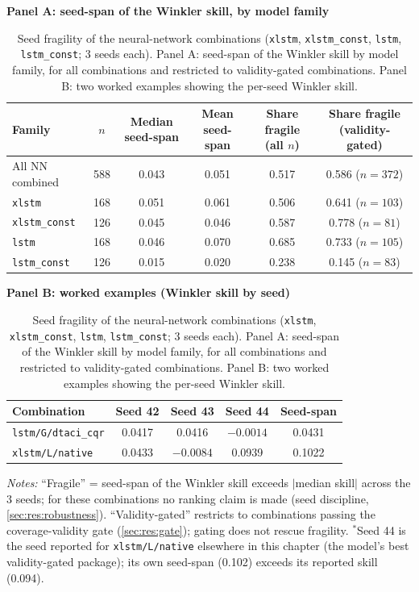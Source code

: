 \begin{table}[t]
\centering
\caption{Seed fragility of the neural-network combinations (\texttt{xlstm}, \texttt{xlstm\_const}, \texttt{lstm}, \texttt{lstm\_const}; 3 seeds each). Panel A: seed-span of the Winkler skill by model family, for all combinations and restricted to validity-gated combinations. Panel B: two worked examples showing the per-seed Winkler skill.}
\label{tab:res_robustness_seeds}

\textbf{Panel A: seed-span of the Winkler skill, by model family}\\[1mm]
\begin{tabular}{lccccc}
\toprule
Family & $n$ & Median seed-span & Mean seed-span & Share fragile (all $n$) & Share fragile (validity-gated) \\
\midrule
All NN combined      & 588 & 0.043 & 0.051 & 0.517 & 0.586 ($n=372$) \\
\texttt{xlstm}        & 168 & 0.051 & 0.061 & 0.506 & 0.641 ($n=103$) \\
\texttt{xlstm\_const}  & 126 & 0.045 & 0.046 & 0.587 & 0.778 ($n=81$)  \\
\texttt{lstm}          & 168 & 0.046 & 0.070 & 0.685 & 0.733 ($n=105$) \\
\texttt{lstm\_const}   & 126 & 0.015 & 0.020 & 0.238 & 0.145 ($n=83$)  \\
\bottomrule
\end{tabular}

\vspace{3mm}
\textbf{Panel B: worked examples (Winkler skill by seed)}\\[1mm]
\begin{tabular}{lcccc}
\toprule
Combination & Seed 42 & Seed 43 & Seed 44 & Seed-span \\
\midrule
\texttt{lstm/G/dtaci\_cqr}  & 0.0417 & 0.0416 & $-0.0014$ & 0.0431 \\
\texttt{xlstm/L/native}     & 0.0433 & $-0.0084$ & 0.0939\rlap{$^\ast$} & 0.1022 \\
\bottomrule
\end{tabular}

\vspace{3mm}
{\footnotesize\textit{Notes:} ``Fragile'' = seed-span of the Winkler skill exceeds $|$median skill$|$ across the 3 seeds; for these combinations no ranking claim is made (seed discipline, \cref{sec:res:robustness}). ``Validity-gated'' restricts to combinations passing the coverage-validity gate (\cref{sec:res:gate}); gating does not rescue fragility. $^\ast$Seed 44 is the seed reported for \texttt{xlstm/L/native} elsewhere in this chapter (the model's best validity-gated package); its own seed-span (0.102) exceeds its reported skill (0.094).}
\end{table}


